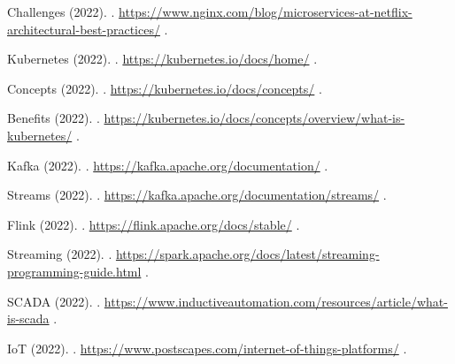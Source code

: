 \begin{thebibliography}{99}
    Challenges (2022).
    .
    \newblock \url{https://www.nginx.com/blog/microservices-at-netflix-architectural-best-practices/}
    \newblock [Accessed: 01/01/2024].

    Kubernetes (2022).
    .
    \newblock \url{https://kubernetes.io/docs/home/}
    \newblock [Accessed: 01/01/2024].

    Concepts (2022).
    .
    \newblock \url{https://kubernetes.io/docs/concepts/}
    \newblock [Accessed: 01/01/2024].

    Benefits (2022).
    .
    \newblock \url{https://kubernetes.io/docs/concepts/overview/what-is-kubernetes/}
    \newblock [Accessed: 01/01/2024].

    Kafka (2022).
    .
    \newblock \url{https://kafka.apache.org/documentation/}
    \newblock [Accessed: 01/01/2024].

    Streams (2022).
    .
    \newblock \url{https://kafka.apache.org/documentation/streams/}
    \newblock [Accessed: 01/01/2024].

    Flink (2022).
    .
    \newblock \url{https://flink.apache.org/docs/stable/}
    \newblock [Accessed: 01/01/2024].

    Streaming (2022).
    .
    \newblock \url{https://spark.apache.org/docs/latest/streaming-programming-guide.html}
    \newblock [Accessed: 01/01/2024].

    SCADA (2022).
    .
    \newblock \url{https://www.inductiveautomation.com/resources/article/what-is-scada}
    \newblock [Accessed: 01/01/2024].

    IoT (2022).
    .
    \newblock \url{https://www.postscapes.com/internet-of-things-platforms/}
    \newblock [Accessed: 01/01/2024].


\end{thebibliography}

